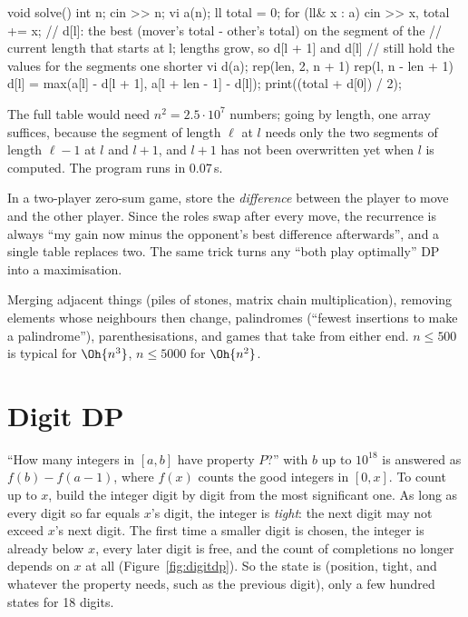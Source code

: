 \begin{code}
void solve() {
    int n;
    cin >> n;
    vi a(n);
    ll total = 0;
    for (ll& x : a) cin >> x, total += x;
    // d[l]: the best (mover's total - other's total) on the segment of the
    // current length that starts at l; lengths grow, so d[l + 1] and d[l]
    // still hold the values for the segments one shorter
    vi d(a);
    rep(len, 2, n + 1) rep(l, n - len + 1)
        d[l] = max(a[l] - d[l + 1], a[l + len - 1] - d[l]);
    print((total + d[0]) / 2);
}
\end{code}

The full table would need $n^2 = 2.5 \cdot 10^7$ numbers; going by length, one array suffices, because the segment of length
$\ell$ at $l$ needs only the two segments of length $\ell - 1$ at $l$ and $l + 1$, and $l + 1$ has not been overwritten yet when
$l$ is computed. The program runs in 0.07\,s.


\begin{trick}
In a two-player zero-sum game, store the \emph{difference} between the player to move and the other player. Since the roles swap
after every move, the recurrence is always ``my gain now minus the opponent's best difference afterwards'', and a single table
replaces two. The same trick turns any ``both play optimally'' DP into a maximisation.
\end{trick}

\begin{recognize}
Merging adjacent things (piles of stones, matrix chain multiplication), removing elements whose neighbours then change, palindromes
(``fewest insertions to make a palindrome''), parenthesisations, and games that take from either end. $n \le 500$ is typical for
$\Oh{n^3}$, $n \le 5000$ for $\Oh{n^2}$.
\end{recognize}

\section[Digit DP]{Digit DP \hfill \plat}\label{sec:digitdp}

``How many integers in $[a, b]$ have property $P$?'' with $b$ up to $10^{18}$ is answered as $f(b) - f(a - 1)$, where $f(x)$
counts the good integers in $[0, x]$. To count up to $x$, build the integer digit by digit from the most significant one. As long as
every digit so far equals $x$'s digit, the integer is \emph{tight}: the next digit may not exceed $x$'s next digit. The first time a
smaller digit is chosen, the integer is already below $x$, every later digit is free, and the count of completions no longer depends
on $x$ at all (Figure~\ref{fig:digitdp}). So the state is (position, tight, and whatever the property needs, such as the previous
digit), only a few hundred states for 18 digits.

